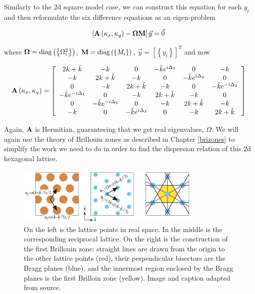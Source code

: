Similarly to the 2d square model case, we can construct this equation for each
$y_i$ and then reformulate the six difference equations as an eigen-problem

\begin{align}
  \left[\mathbf{A}\left(\kappa_{x},\kappa_{y}\right)-\mathbf{\Omega}\mathbf{M}\right]\vec{y}=\vec{0}
\label{eq:hexeig}
\end{align}

where $\mathbf{\Omega}=\operatorname{diag}\left(\left\{\Omega_i^2\right\}\right)$,
$\mathbf{M}=\operatorname{diag}\left(\left\{M_i\right\}\right)$,
$\vec{y}=\left[\left\{y_i\right\}\right]^T$ and now

\begin{align}
  \mathbf{A}\left(\kappa_{x},\kappa_{y}\right)=\left[
\begin{array}{cccccc}
2k+\tilde{k} & -k & 0 & -\tilde{k}e^{i\Delta_1} & 0 & -k\\
-k & 2k+\tilde{k} & -k & 0 & -\tilde{k}e^{i\Delta_2} & 0\\
0 & -k & 2k +\tilde{k} & -k & 0 & -\tilde{k}e^{-i\Delta_3}\\
-\tilde{k}e^{-i\Delta_1} & 0 & -k & 2k+\tilde{k} & -k & 0\\
0 & -\tilde{k}e^{-i\Delta_2} & 0 & -k & 2k+\tilde{k} & -k\\
-k & 0 & -\tilde{k}e^{i\Delta_3} & 0 & -k & 2k+\tilde{k}
\end{array}\right]
\end{align}

Again, $\mathbf{A}$ is Hermitian, guaranteeing that we get real eigenvalues,
$\Omega$. We will again use the theory of Brillouin zones as described in
Chapter \ref{brizones} to simplify the work we need to do in order to find the
dispersion relation of this 2d hexagonal lattice.

\begin{figure}[!h]
\centering
\includegraphics[width=0.8\textwidth]{imgs/bzonehex.png}
\caption{\label{fig:bzonehex} On the left is the lattice points in real space.
    In the middle is the corresponding reciprocal lattice. On the right is the
    construction of the first Brillouin zone: straight lines are drawn from the
    origin to the other lattice points (red), their perpendicular bisectors are
    the Bragg planes (blue), and the innermost region enclosed by the Bragg
    planes is the first Brilloin zone (yellow). Image and caption adapted from
    source.\cite{moldinglight}}
\end{figure}

